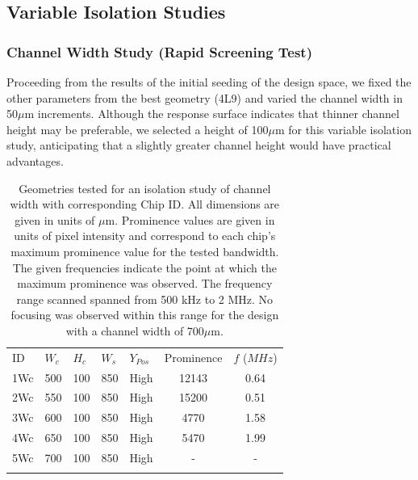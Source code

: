 \subsection{Variable Isolation Studies}
\label{ssec:iso}

\subsubsection{Channel Width Study (Rapid Screening Test)}
\label{sssec:width}

Proceeding from the  results of the initial seeding of the design space,  we fixed the other parameters from the best geometry (4L9) and varied the channel width in 50$\mu$m increments.  Although the response surface indicates that thinner channel height may be preferable,  we selected a height of 100$\mu$m for this variable isolation study, anticipating that a slightly greater channel height would have practical advantages. 

\begin{table}[h]
	\caption[Geometries tested for an isolation study of channel width]{Geometries tested for an isolation study of channel width with corresponding Chip ID. All dimensions are given in units of $\mu$m. Prominence values are given in units of pixel intensity and correspond to each chip's maximum prominence value for the tested bandwidth. The given frequencies indicate the point at which the maximum prominence was observed. The frequency range scanned spanned from 500 kHz to 2 MHz. No focusing was observed within this range for the design with a channel width of 700$\mu$m. }   
\label{tab:width}       %
\centering
\begin{tabular}{lllll|cc}
\hline\noalign{\smallskip}
ID & $W_c$ & $H_c$ & $W_s$ & $Y_{Pos}$ & Prominence & $f$ ($MHz$)\\
\noalign{\smallskip}\hline\noalign{\smallskip}
1Wc & 500 & 100 & 850 & High & 12143 & 0.64\\
2Wc & 550 & 100 & 850 & High & 15200 & 0.51\\
3Wc & 600 & 100 & 850 & High & 4770 & 1.58\\
4Wc & 650 & 100 & 850 & High & 5470 & 1.99\\
5Wc & 700 & 100 & 850 & High & - & - \\
\noalign{\smallskip}\hline
\end{tabular}
\end{table}

